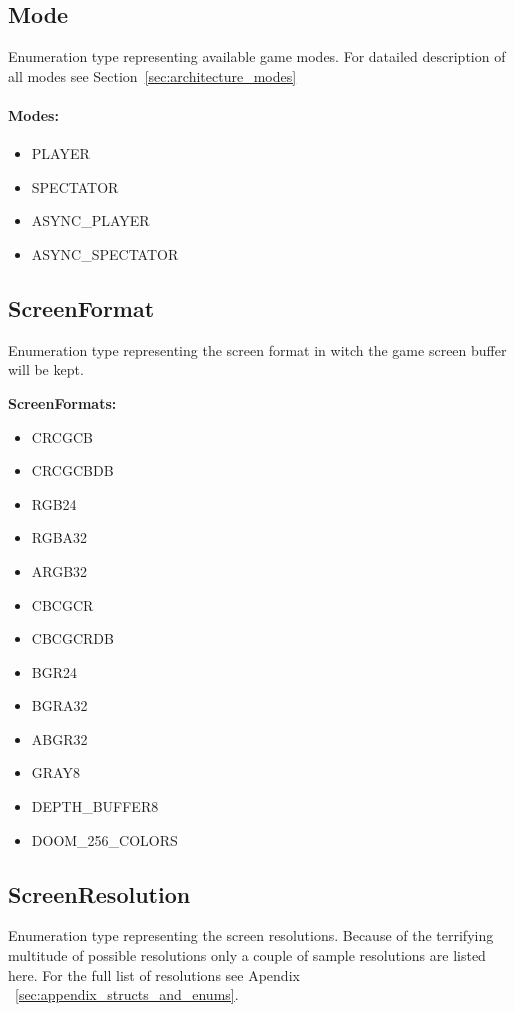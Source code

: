 \subsection{Mode}\label{subsec:mode}
Enumeration type representing available game modes. For datailed description of all modes see Section~\ref{sec:architecture_modes}

\paragraph{Modes:}

\begin{itemize}
	\item PLAYER
	\item SPECTATOR
	\item ASYNC\_PLAYER 
	\item ASYNC\_SPECTATOR 
\end{itemize}

\subsection{ScreenFormat}\label{subsec:screenformat}
Enumeration type representing the screen format in witch the game screen buffer will be kept. 


\vspace{20pt}
\textbf{ScreenFormats:}
\begin{itemize}
 \item CRCGCB 
 \item CRCGCBDB
 \item RGB24
 \item RGBA32
 \item ARGB32
 \item CBCGCR
 \item CBCGCRDB
 \item BGR24
 \item BGRA32
 \item ABGR32
 \item GRAY8
 \item DEPTH\_BUFFER8
 \item DOOM\_256\_COLORS
\end{itemize}
\subsection{ScreenResolution} \label{subsec:screenresolution}
Enumeration type representing the screen resolutions. Because of the terrifying multitude of possible resolutions only a couple of sample resolutions are listed here. For the full list of resolutions see Apendix ~\ref{sec:appendix_structs_and_enums}.



